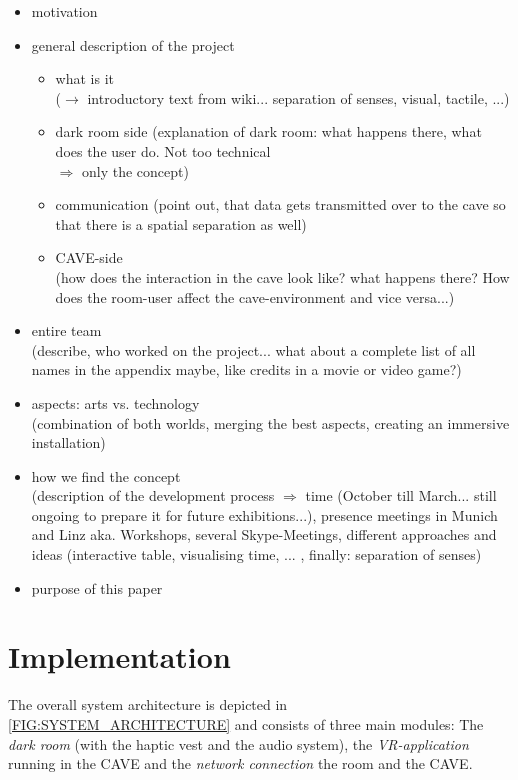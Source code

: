 \documentclass[conference]{acmsiggraph}
\begin{document}
\begin{itemize}
\item motivation
\item{
	general description of the project
	\begin{itemize}
	\item what is it\\
	 ($\rightarrow$ introductory text from wiki... separation of senses, visual, tactile, ...)
	\item dark room side (explanation of dark room: what happens there, what does the user do. Not too technical\\
	 $\Rightarrow$ only the concept)
	\item communication
	(point out, that data gets transmitted over to the cave so that there is a spatial separation as well)
	\item CAVE-side\\
	(how does the interaction in the cave look like? what happens there? How does the room-user affect the cave-environment and vice versa...)
	\end{itemize}
}
\item entire team\\
	  (describe, who worked on the project... what about a complete list of all names in the appendix maybe, like credits in a movie or video game?)
\item aspects: arts vs. technology\\
		(combination of both worlds, merging the best aspects, creating an immersive installation)
\item how we find the concept\\
		(description of the development process $\Rightarrow$ time (October till March... still ongoing to prepare it for future exhibitions...), presence meetings in Munich and Linz aka. Workshops, several Skype-Meetings, different approaches and ideas (interactive table, visualising time, ... , finally: separation of senses) 
\item purpose of this paper
\end{itemize}

\section{Implementation}





The overall system architecture is depicted in \cref{FIG:SYSTEM_ARCHITECTURE} and consists of three main modules: The \textit{dark room} (with the haptic vest and the audio system), the \textit{VR-application} running in the CAVE and the \textit{network connection} the room and the CAVE.
\end{document}
